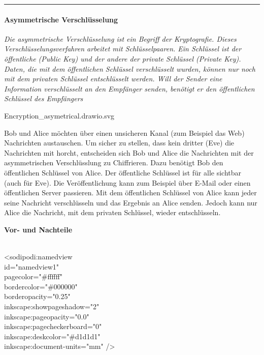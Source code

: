 \documentclass[
]{article}
\begin{document}
\begin{center}\rule{0.5\linewidth}{0.5pt}\end{center}

\paragraph{Asymmetrische
Verschlüsselung}\label{asymmetrische-verschluxfcsselung}

\emph{Die asymmetrische Verschlüsselung ist ein Begriff der
Kryptografie. Dieses Verschlüsselungsverfahren arbeitet mit
Schlüsselpaaren. Ein Schlüssel ist der öffentliche (Public Key) und der
andere der private Schlüssel (Private Key). Daten, die mit dem
öffentlichen Schlüssel verschlüsselt wurden, können nur noch mit dem
privaten Schlüssel entschlüsselt werden. Will der Sender eine
Information verschlüsselt an den Empfänger senden, benötigt er den
öffentlichen Schlüssel des Empfängers}

{Encryption\_asymetrical.drawio.svg}

Bob und Alice möchten über einen unsicheren Kanal (zum Beispiel das Web)
Nachrichten austauschen. Um sicher zu stellen, dass kein dritter (Eve)
die Nachrichten mit horcht, entscheiden sich Bob und Alice die
Nachrichten mit der asymmetrischen Verschlüsslung zu Chiffrieren. Dazu
benötigt Bob den öffentlichen Schlüssel von Alice. Der öffentliche
Schlüssel ist für alle sichtbar (auch für Eve). Die Veröffentlichung
kann zum Beispiel über E-Mail oder einen öffentlichen Server passieren.
Mit dem öffentlichen Schlüssel von Alice kann jeder seine Nachricht
verschlüsseln und das Ergebnis an Alice senden. Jedoch kann nur Alice
die Nachricht, mit dem privaten Schlüssel, wieder entschlüsseln.

\hfill\break

\textbf{Vor- und Nachteile}

\strut \\
\textless sodipodi:namedview\\
id="namedview1"\\
pagecolor="\#ffffff"\\
bordercolor="\#000000"\\
borderopacity="0.25"\\
inkscape:showpageshadow="2"\\
inkscape:pageopacity="0.0"\\
inkscape:pagecheckerboard="0"\\
inkscape:deskcolor="\#d1d1d1"\\
inkscape:document-units="mm" /\textgreater{}\\
\end{document}
